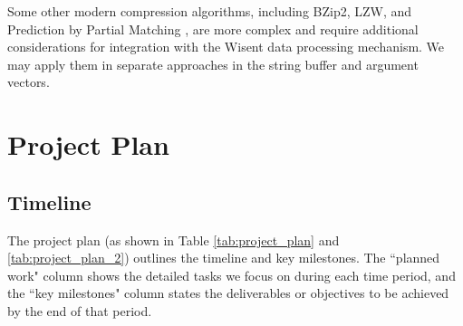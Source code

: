 Some other modern compression algorithms, including BZip2, LZW, and Prediction by Partial Matching \cite{gupta2017modern}, are more complex and require additional considerations for integration with the Wisent data processing mechanism. We may apply them in separate approaches in the string buffer and argument vectors. 



\newpage







\chapter{Project Plan}
\thispagestyle{chapterstyle}

\section{Timeline}

The project plan (as shown in Table \ref{tab:project_plan} and \ref{tab:project_plan_2}) outlines the timeline and key milestones. The ``planned work" column shows the detailed tasks we focus on during each time period, and the ``key milestones" column states the deliverables or objectives to be achieved by the end of that period. 

